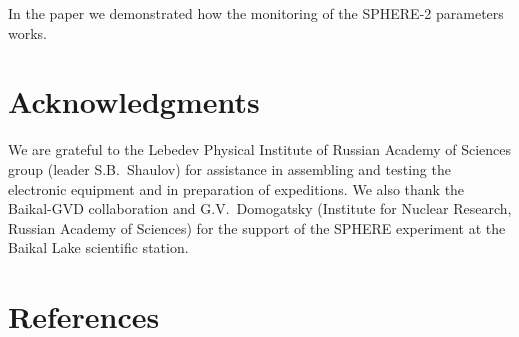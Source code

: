 \documentclass[final,5p,times,twocolumn]{elsarticle}
\begin{document}
In the paper we demonstrated how the monitoring of the SPHERE-2 parameters works. 


\section{Acknowledgments}
We are grateful to the Lebedev Physical Institute of Russian Academy of Sciences group (leader S.B.~Shaulov) for assistance in assembling and testing the electronic equipment and in preparation of expeditions. We also thank the Baikal-GVD collaboration and G.V.~Domogatsky (Institute for Nuclear Research, Russian Academy of Sciences) for the support of the SPHERE experiment at the Baikal Lake scientific station.


\section{References}

\end{document}
